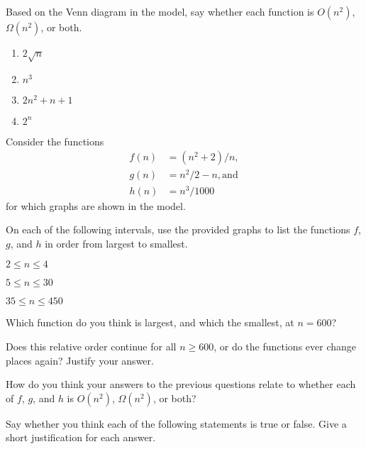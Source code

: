 \documentclass{tufte-handout}
\begin{document}
\begin{questions}
\item Based on the Venn diagram in the model, say whether each
  function is $O(n^2)$, $\Omega(n^2)$, or both. 
  \begin{enumerate}[label=(\alph*)]
    \item $2\sqrt n$
    \item $n^3$
    \item $2n^2 + n + 1$
    \item $2^n$
    \end{enumerate}
\end{questions}
Consider the functions
\begin{align*}
  f(n) &= (n^2 + 2)/n, \\ g(n) &= n^2/2 - n, \text{and} \\ h(n) &= n^3/1000
\end{align*}
for which graphs are shown in the model.
\begin{questions}
\item On each of the following intervals, use the provided graphs to
  list the functions $f$, $g$, and $h$ in order from largest to
  smallest.
  \begin{subquestions}
  \item $2 \leq n \leq 4$
  \item $5 \leq n \leq 30$
  \item $35 \leq n \leq 450$
  \end{subquestions}
\item Which function do you think is largest, and which the smallest,
  at $n = 600$?
\item Does this relative order continue for all $n \geq 600$, or do
  the functions ever change places again?  Justify your answer.
 \newpage
\item How do you think your answers to the previous questions relate
  to whether each of $f$, $g$, and $h$ is $O(n^2)$, $\Omega(n^2)$, or both?
\end{questions}

\noindent Say whether you think each of the following statements is
true or false.  Give a short justification for each answer.
\end{document}
